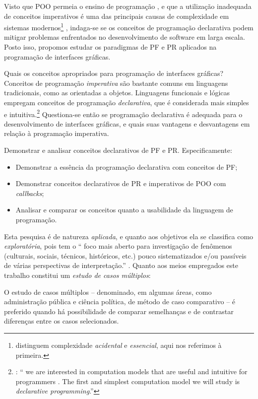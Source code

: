 Visto que POO permeia o ensino de programação \cite{vanroy2003}, e que a
utilização inadequada de conceitos imperativos é uma das principais causas de
complexidade em sistemas modernos\footnote{\textcite{moseley2006} distinguem complexidade \emph{acidental} e
\emph{essencial}, aqui nos referimos à primeira.} \cite{moseley2006}, indaga-se se
os conceitos de programação declarativa podem mitigar problemas enfrentados no
desenvolvimento de software em larga escala.
Posto isso, propomos estudar os paradigmas de PF e PR aplicados na programação
de interfaces gráficas.

Quais os conceitos apropriados para programação de interfaces gráficas?
Conceitos de programação \emph{imperativa} são bastante comuns em linguagens
tradicionais, como as orientadas a objetos.
Linguagens funcionais e lógicas empregam conceitos de programação
\emph{declarativa}, que é considerada mais simples e intuitiva.\footnote{\textcite[p. 31]{roy2004}: “\textelp{} we are interested in
computation models that are useful and intuitive for programmers \textelp{}. The
first and simplest computation model we will study is \emph{declarative
programming}.”}
Questiona-se então se programação declarativa é adequada para o
desenvolvimento de interfaces gráficas, e quais suas vantagens e desvantagens
em relação à programação imperativa.

Demonstrar e analisar conceitos declarativos de PF e PR. Especificamente:

\begin{itemize}
\item Demonstrar a essência da programação declarativa com conceitos de PF;
\item Demonstrar conceitos declarativos de PR e imperativos de POO com
\emph{callbacks};
\item Analisar e comparar os conceitos quanto a usabilidade da linguagem de
programação.
\end{itemize}

Esta pesquisa é de natureza \emph{aplicada}, e quanto aos objetivos ela se
classifica como \emph{exploratória}, pois tem o “\textelp{} foco mais aberto para
investigação de fenômenos (culturais, sociais, técnicos, históricos, etc.)
pouco sistematizados e/ou passíveis de várias perspectivas de interpretação.”
\cite[p. 32]{leal2011}.
Quanto aos meios empregados este trabalho constitui um \emph{estudo de casos
múltiplos}:

\begin{citacao}
  O estudo de casos múltiplos – denominado, em algumas áreas, como
  administração pública e ciência política, de método de caso comparativo – é
  preferido quando há possibilidade de comparar semelhanças e de contrastar
  diferenças entre os casos selecionados. \cite[p. 43]{leal2011}
\end{citacao}

